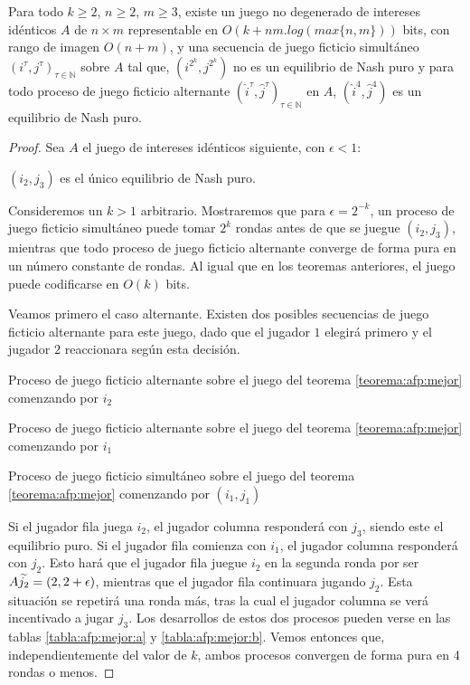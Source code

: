\begin{theorem} \label{teorema:afp:mejor}
    Para todo $k \geq 2$, $n\geq 2$, $m\geq 3$, existe un juego no degenerado de intereses idénticos $A$ de $n\times m$ representable en $O(k+nm. log(max\{n,m\}))$ bits, con rango de imagen $O(n+m)$, y una secuencia de juego ficticio simultáneo $(i^\tau, j^\tau)_{\tau \in \mathbb{N}}$ sobre $A$ tal que, $(i^{2^k}, j^{2^k})$ no es un equilibrio de Nash puro y para todo proceso de juego ficticio alternante $(\widehat{i}^\tau, \widehat{j}^\tau)_{\tau \in \mathbb{N}}$ en $A$, $(\widehat{i}^4, \widehat{j}^4)$ es un equilibrio de Nash puro.
\end{theorem}
\begin{proof}
    Sea $A$ el juego de intereses idénticos siguiente, con $\epsilon < 1$:

    

    $(i_2, j_3)$ es el único equilibrio de Nash puro.

    Consideremos un $k > 1$ arbitrario. Mostraremos que para $\epsilon = 2^{-k}$, un proceso de juego ficticio simultáneo puede tomar $2^k$ rondas antes de que se juegue $(i_2, j_3)$, mientras que todo proceso de juego ficticio alternante converge de forma pura en un número constante de rondas. Al igual que en los teoremas anteriores, el juego puede codificarse en $O(k)$ bits.

    Veamos primero el caso alternante. Existen dos posibles secuencias de juego ficticio alternante para este juego, dado que el jugador $1$ elegirá primero y el jugador $2$ reaccionara según esta decisión.

    \begin{table}
        \centering
        
        \caption{Proceso de juego ficticio alternante sobre el juego del teorema \ref{teorema:afp:mejor} comenzando por $i_2$}
        \label{tabla:afp:mejor:b}
        \centering
        
        \caption{Proceso de juego ficticio alternante sobre el juego del teorema \ref{teorema:afp:mejor} comenzando por $i_1$}
        \label{tabla:afp:mejor:a}
        \centering
        
        \caption{Proceso de juego ficticio simultáneo sobre el juego del teorema \ref{teorema:afp:mejor} comenzando por $(i_1, j_1)$}
        \label{tabla:afp:mejor:c}
    \end{table}

    Si el jugador fila juega $i_2$, el jugador columna responderá con $j_3$, siendo este el equilibrio puro. Si el jugador fila comienza con $i_1$, el jugador columna responderá con $j_2$. Esto hará que el jugador fila juegue $i_2$ en la segunda ronda por ser $A\widetilde{j_2} = (2, 2 + \epsilon)$, mientras que el jugador fila continuara jugando $j_2$. Esta situación se repetirá una ronda más, tras la cual el jugador columna se verá incentivado a jugar $j_3$. Los desarrollos de estos dos procesos pueden verse en las tablas \ref{tabla:afp:mejor:a} y \ref{tabla:afp:mejor:b}. Vemos entonces que, independientemente del valor de $k$, ambos procesos convergen de forma pura en 4 rondas o menos.


\end{proof}
